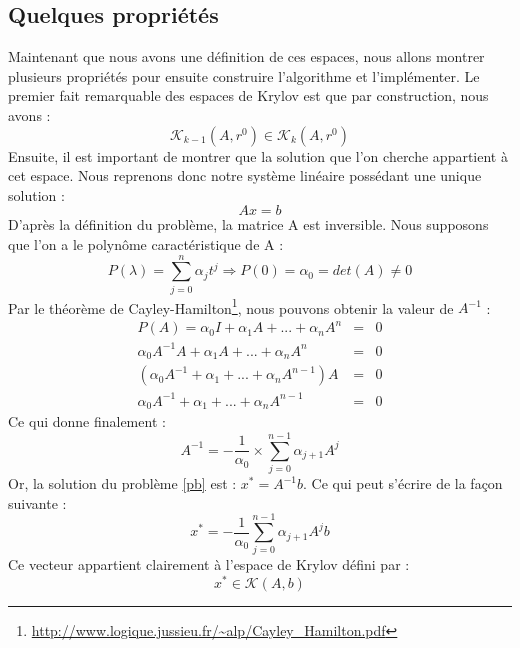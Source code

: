 \subsection{Quelques propriétés}
Maintenant que nous avons une définition de ces espaces, nous allons montrer plusieurs propriétés pour ensuite construire l'algorithme et l'implémenter. Le premier fait remarquable des espaces de Krylov est que par construction, nous avons :  
\begin{equation}
\mathcal{K}_{k - 1}(A, r^0) \in \mathcal{K}_k(A, r^0)
\end{equation}
Ensuite, il est important de montrer que la solution que l'on cherche appartient à cet espace. Nous reprenons donc notre système linéaire possédant une unique solution : 
\begin{equation}
Ax = b \label{pb}
\end{equation}
D'après la définition du problème, la matrice A est inversible. Nous supposons que l'on a le polynôme caractéristique de A :
\begin{equation}
P(\lambda) = \sum_{j = 0}^{n} \alpha_j t^j \Rightarrow P(0) = \alpha_0 = det(A) \neq 0
\end{equation}
Par le théorème de Cayley-Hamilton\footnote{\url{http://www.logique.jussieu.fr/~alp/Cayley_Hamilton.pdf}}, nous pouvons obtenir la valeur de $A^{-1}$ :
\begin{eqnarray}
P(A) = \alpha_0 I + \alpha_1 A + ... + \alpha_n A^n &=& 0 \\
\alpha_0 A^{-1}A + \alpha_1 A + ... + \alpha_n A^n &=& 0 \\
(\alpha_0 A^{-1} + \alpha_1  + ... + \alpha_n A^{n - 1})A &=& 0 \\
\alpha_0 A^{-1} + \alpha_1  + ... + \alpha_n A^{n - 1} &=& 0
\end{eqnarray}
Ce qui donne finalement :
\begin{equation}
A^{-1} = - \frac{1}{\alpha_0} \times \sum_{j=0}^{n-1} \alpha_{j+1} A^j
\end{equation}
Or, la solution du problème \ref{pb} est : $x^* = A^{-1}b$. Ce qui peut s'écrire de la façon suivante : 
\begin{equation}
x^* = - \frac{1}{\alpha_0} \sum_{j=0}^{n-1} \alpha_{j+1} A^j b
\end{equation}
Ce vecteur appartient clairement à l'espace de Krylov défini par : 
\begin{equation}
x^* \in \mathcal{K}(A, b)
\end{equation}
